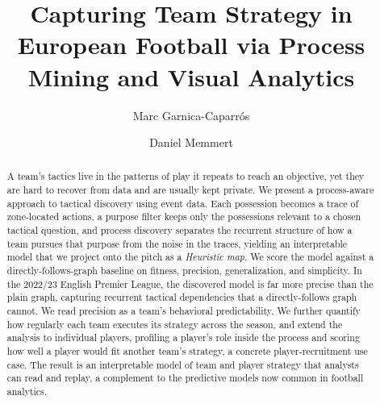 \documentclass[runningheads]{llncs}
\begin{document}
%
\title{Capturing Team Strategy in European Football via Process Mining and Visual Analytics}
%
%
\author{Marc Garnica-Caparrós \and
Daniel Memmert}
%
%
%
\maketitle              %
%
\begin{abstract}
A team's tactics live in the patterns of play it repeats to reach an objective, yet they are hard to recover from data and are usually kept private. We present a process-aware approach to tactical discovery using event data. Each possession becomes a trace of zone-located actions, a purpose filter keeps only the possessions relevant to a chosen tactical question, and process discovery separates the recurrent structure of how a team pursues that purpose from the noise in the traces, yielding an interpretable model that we project onto the pitch as a \emph{Heuristic map}. We score the model against a directly-follows-graph baseline on fitness, precision, generalization, and simplicity. In the 2022/23 English Premier League, the discovered model is far more precise than the plain graph, capturing recurrent tactical dependencies that a directly-follows graph cannot. We read precision as a team's behavioral predictability. We further quantify how regularly each team executes its strategy across the season, and extend the analysis to individual players, profiling a player's role inside the process and scoring how well a player would fit another team's strategy, a concrete player-recruitment use case. The result is an interpretable model of team and player strategy that analysts can read and replay, a complement to the predictive models now common in football analytics.

\end{abstract}
%
%
%
\end{document}
